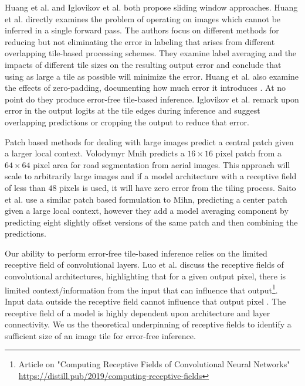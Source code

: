 \documentclass[runningheads]{llncs}
\begin{document}
Huang et al. and Iglovikov et al. \cite{Huang2019a,Iglovikov2017} both propose sliding window approaches.  Huang et al. \cite{Huang2019a} directly examines the problem of operating on images which cannot be inferred in a single forward pass. The authors focus on different methods for reducing but not eliminating the error in labeling that arises from different overlapping tile-based processing schemes. They examine label averaging and the impacts of different tile sizes on the resulting output error and conclude that using as large a tile as possible will minimize the error. Huang et al. \cite{Huang2019a} also examine the effects of zero-padding, documenting how much error it introduces . At no point do they produce error-free tile-based inference. Iglovikov et al. \cite{Iglovikov2017} remark upon error in the output logits at the tile edges during inference and suggest overlapping predictions or cropping the output to reduce that error. 

Patch based methods for dealing with large images predict a central patch given a larger local context. Volodymyr Mnih \cite{Mnih2013} predicts a $16 \times 16$ pixel patch from a $64 \times 64$ pixel area for road segmentation from aerial images. This approach will scale to arbitrarily large images and if a model architecture with a receptive field of less than $48$ pixels is used, it will have zero error from the tiling process. Saito et al. \cite{Saito2016} use a similar patch based formulation to Mihn, predicting a center patch given a large local context, however they add a model averaging component by predicting eight slightly offset versions of the same patch and then combining the predictions.

Our ability to perform error-free tile-based inference relies on the limited receptive field of convolutional layers. Luo et al. \cite{Luo2016} discuss the receptive fields of convolutional architectures, highlighting that for a given output pixel, there is limited context/information from the input that can influence that output\footnote{Article on "Computing Receptive Fields of Convolutional Neural Networks" \cite{araujo2019computing} \url{https://distill.pub/2019/computing-receptive-fields}}. Input data outside the receptive field cannot influence that output pixel \cite{Luo2016}. The receptive field of a model is highly dependent upon architecture and layer connectivity. We us the theoretical underpinning of receptive fields to identify a sufficient size of an image tile for error-free inference.  
\end{document}
